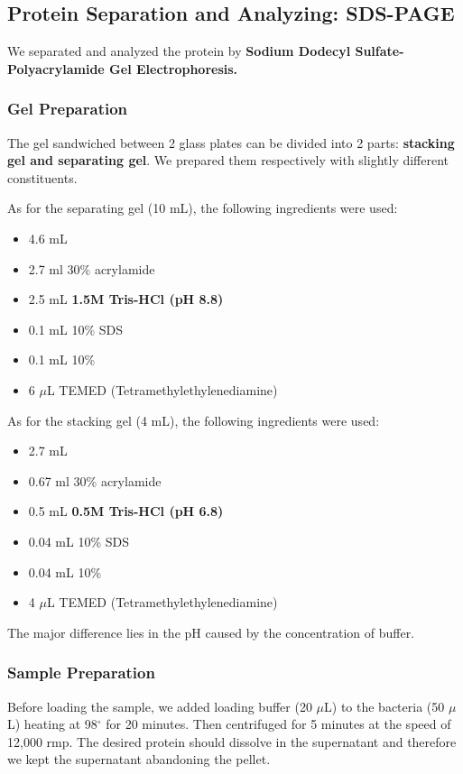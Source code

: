 \documentclass{article}
\begin{document}
\subsection{Protein Separation and Analyzing: SDS-PAGE}
We separated and analyzed the protein by \textbf{Sodium Dodecyl Sulfate-Polyacrylamide Gel Electrophoresis.} 
\subsubsection{Gel Preparation}
The gel sandwiched between 2 glass plates can be divided into 2 parts: \textbf{stacking gel and separating gel}. We prepared them respectively with slightly different constituents.

As for the separating gel (10 mL), the following ingredients were used:
\begin{itemize}
    \item 4.6 mL 
    \item 2.7 ml 30\% acrylamide
    \item 2.5 mL \textbf{1.5M Tris-HCl (pH 8.8)}
    \item 0.1 mL 10\% SDS
    \item 0.1 mL 10\% 
    \item 6 $\mu$L TEMED (Tetramethylethylenediamine)
\end{itemize} 

As for the stacking gel (4 mL), the following ingredients were used:
\begin{itemize}
    \item 2.7 mL 
    \item 0.67 ml 30\% acrylamide
    \item 0.5 mL \textbf{0.5M Tris-HCl (pH 6.8)}
    \item 0.04 mL 10\% SDS
    \item 0.04 mL 10\% 
    \item 4 $\mu$L TEMED (Tetramethylethylenediamine)
\end{itemize}
The major difference lies in the pH caused by the concentration of buffer.
\subsubsection{Sample Preparation}
Before loading the sample, we added loading buffer (20 $\mu$L) to the bacteria (50 $\mu$L) heating at 98$^\circ$ for 20 minutes.
Then centrifuged for 5 minutes at the speed of 12,000 rmp.
The desired protein should dissolve in the supernatant and therefore we kept the supernatant abandoning the pellet.
\end{document}
